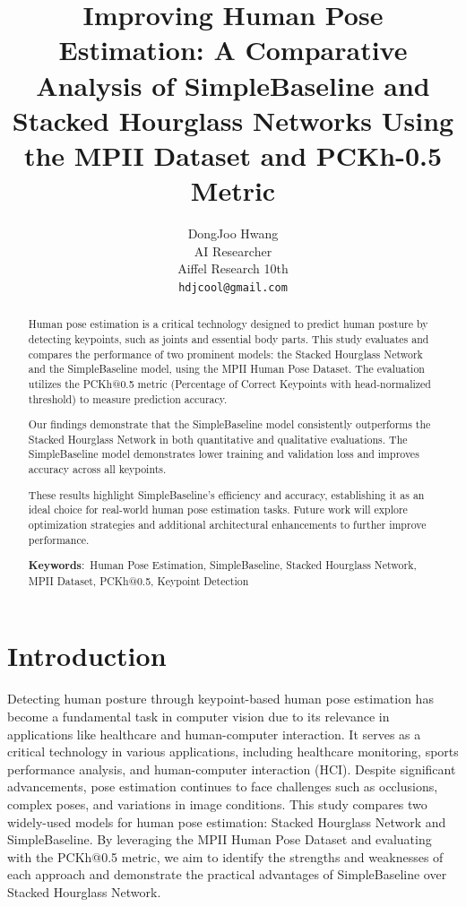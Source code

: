 \documentclass{article}
\title{Improving Human Pose Estimation: A Comparative Analysis of SimpleBaseline and Stacked Hourglass Networks Using the MPII Dataset and PCKh-0.5 Metric}
\author{%
  DongJoo Hwang \\
  AI Researcher \\
  Aiffel Research 10th \\
  \texttt{hdjcool@gmail.com} \\
}
\begin{document}
\maketitle


\begin{abstract}
Human pose estimation is a critical technology designed to predict human posture by detecting keypoints, such as joints and essential body parts. This study evaluates and compares the performance of two prominent models: the Stacked Hourglass Network and the SimpleBaseline model, using the MPII Human Pose Dataset. The evaluation utilizes the PCKh@0.5 metric (Percentage of Correct Keypoints with head-normalized threshold) to measure prediction accuracy.

Our findings demonstrate that the SimpleBaseline model consistently outperforms the Stacked Hourglass Network in both quantitative and qualitative evaluations. The SimpleBaseline model demonstrates lower training and validation loss and improves accuracy across all keypoints.

These results highlight SimpleBaseline’s efficiency and accuracy, establishing it as an ideal choice for real-world human pose estimation tasks. Future work will explore optimization strategies and additional architectural enhancements to further improve performance.

\textbf{Keywords}: Human Pose Estimation, SimpleBaseline, Stacked Hourglass Network, MPII Dataset, PCKh@0.5, Keypoint Detection
\end{abstract}


\section{Introduction}


Detecting human posture through keypoint-based human pose estimation has become a fundamental task in computer vision due to its relevance in applications like healthcare and human-computer interaction. It serves as a critical technology in various applications, including healthcare monitoring, sports performance analysis, and human-computer interaction (HCI). Despite significant advancements, pose estimation continues to face challenges such as occlusions, complex poses, and variations in image conditions.
This study compares two widely-used models for human pose estimation: Stacked Hourglass Network and SimpleBaseline. By leveraging the MPII Human Pose Dataset and evaluating with the PCKh@0.5 metric, we aim to identify the strengths and weaknesses of each approach and demonstrate the practical advantages of SimpleBaseline over Stacked Hourglass Network.
\end{document}
